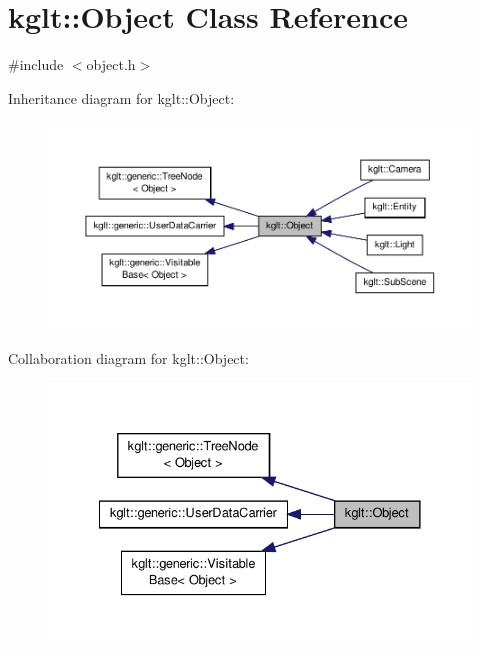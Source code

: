 \hypertarget{classkglt_1_1_object}{\section{kglt\-:\-:Object Class Reference}
\label{classkglt_1_1_object}
}


{\ttfamily \#include $<$object.\-h$>$}



Inheritance diagram for kglt\-:\-:Object\-:\nopagebreak
\begin{figure}[H]
\begin{center}
\leavevmode
\includegraphics[width=350pt]{classkglt_1_1_object__inherit__graph}
\end{center}
\end{figure}


Collaboration diagram for kglt\-:\-:Object\-:\nopagebreak
\begin{figure}[H]
\begin{center}
\leavevmode
\includegraphics[width=332pt]{classkglt_1_1_object__coll__graph}
\end{center}
\end{figure}
